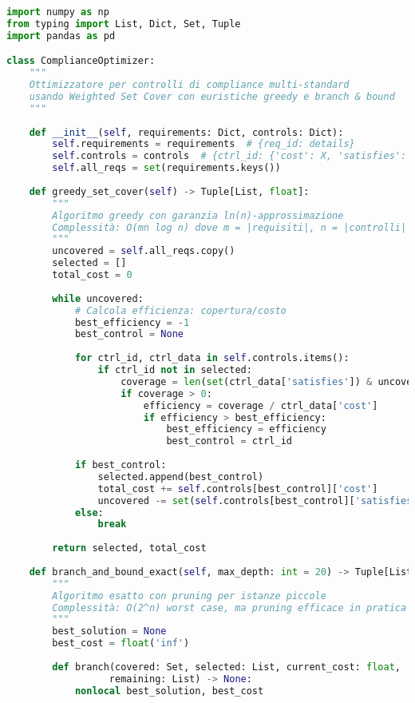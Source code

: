\begin{lstlisting}[language=Python, caption=Implementazione Weighted Set Cover per Compliance]
import numpy as np
from typing import List, Dict, Set, Tuple
import pandas as pd

class ComplianceOptimizer:
    """
    Ottimizzatore per controlli di compliance multi-standard
    usando Weighted Set Cover con euristiche greedy e branch & bound
    """
    
    def __init__(self, requirements: Dict, controls: Dict):
        self.requirements = requirements  # {req_id: details}
        self.controls = controls  # {ctrl_id: {'cost': X, 'satisfies': [req_ids]}}
        self.all_reqs = set(requirements.keys())
        
    def greedy_set_cover(self) -> Tuple[List, float]:
        """
        Algoritmo greedy con garanzia ln(n)-approssimazione
        Complessità: O(mn log n) dove m = |requisiti|, n = |controlli|
        """
        uncovered = self.all_reqs.copy()
        selected = []
        total_cost = 0
        
        while uncovered:
            # Calcola efficienza: copertura/costo
            best_efficiency = -1
            best_control = None
            
            for ctrl_id, ctrl_data in self.controls.items():
                if ctrl_id not in selected:
                    coverage = len(set(ctrl_data['satisfies']) & uncovered)
                    if coverage > 0:
                        efficiency = coverage / ctrl_data['cost']
                        if efficiency > best_efficiency:
                            best_efficiency = efficiency
                            best_control = ctrl_id
            
            if best_control:
                selected.append(best_control)
                total_cost += self.controls[best_control]['cost']
                uncovered -= set(self.controls[best_control]['satisfies'])
            else:
                break
        
        return selected, total_cost
    
    def branch_and_bound_exact(self, max_depth: int = 20) -> Tuple[List, float]:
        """
        Algoritmo esatto con pruning per istanze piccole
        Complessità: O(2^n) worst case, ma pruning efficace in pratica
        """
        best_solution = None
        best_cost = float('inf')
        
        def branch(covered: Set, selected: List, current_cost: float, 
                  remaining: List) -> None:
            nonlocal best_solution, best_cost
            

\end{lstlisting}

